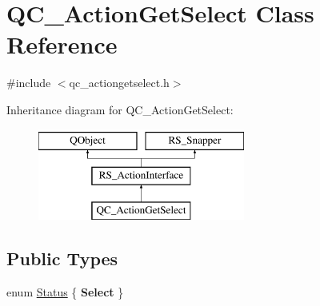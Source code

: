 \hypertarget{classQC__ActionGetSelect}{\section{Q\-C\-\_\-\-Action\-Get\-Select Class Reference}
\label{classQC__ActionGetSelect}
}


{\ttfamily \#include $<$qc\-\_\-actiongetselect.\-h$>$}

Inheritance diagram for Q\-C\-\_\-\-Action\-Get\-Select\-:\begin{figure}[H]
\begin{center}
\leavevmode
\includegraphics[height=3.000000cm]{classQC__ActionGetSelect}
\end{center}
\end{figure}
\subsection*{Public Types}
\begin{DoxyCompactItemize}
\item 
enum \hyperlink{classQC__ActionGetSelect_a3ecbb885911489407e842021af3f195b}{Status} \{ {\bfseries Select}
 \}
\end{DoxyCompactItemize}
